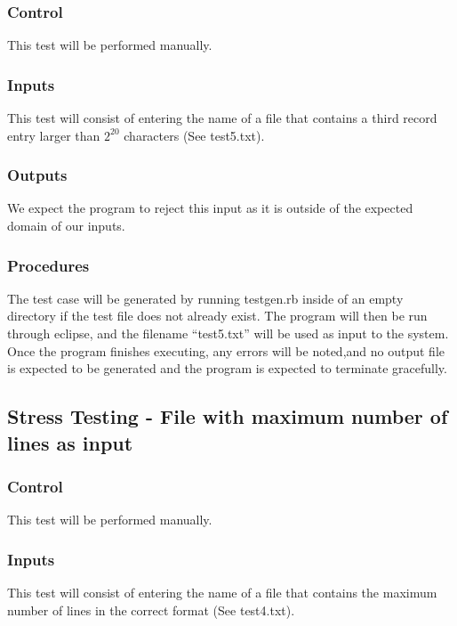 \documentclass[]{article}
\begin{document}
	\subsubsection{Control}
	This test will be performed manually.
	
	\subsubsection{Inputs}
	This test will consist of entering the name of a file that contains a third
	record entry larger than $2^{20}$ characters (See test5.txt).
	
	\subsubsection{Outputs}
	We expect the program to reject this input as it is outside of the expected
	domain of our inputs.
	
	\subsubsection{Procedures}
	The test case will be generated by running testgen.rb inside of an empty
	directory if the test file does not already exist.  The program will then be
	run through eclipse, and the filename ``test5.txt'' will be used as input to
	the system.  Once the program finishes executing, any errors will be noted,and 
	no output file is expected to be generated and the program is expected to
	terminate gracefully.
	

\subsection{Stress Testing - File with maximum number of lines as input}
	\subsubsection{Control}
	This test will be performed manually.
	
	\subsubsection{Inputs}
	This test will consist of entering the name of a file that contains the maximum
	number of lines in the correct format (See test4.txt).
	
\end{document}
